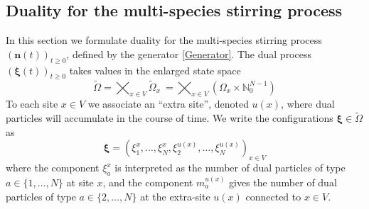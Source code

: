 \documentclass[11pt]{article}
\numberwithin{equation}{section}
\numberwithin{equation}{subsection}
\begin{document}
\subsection{Duality for the multi-species stirring process}\label{statementDualitySubsection}
In this section we formulate duality for the multi-species stirring process $(\mathbf{n}(t))_{t\geq 0}$, defined by the generator \eqref{Generator}.
The dual  process $(\bm{\xi}(t))_{t\geq 0}$ takes values in the enlarged state space
\begin{equation}\label{dualStateSpace}
    \widetilde{\Omega}= \bigtimes_{x\in V} \widetilde{\Omega}_{x}\ = \bigtimes_{x\in V} (\Omega_{x}\times \mathbb{N}_{0}^{N-1})
\end{equation}
To each site $x\in V$ we associate an ``extra site'', denoted $u(x)$,
where dual particles will accumulate in the course of time. 
We write the configurations $\bm{\xi} \in \widetilde\Omega$  as
\begin{equation}
    \bm{\xi}=\left(\xi_{1}^{x},\ldots,\xi_{N}^{x},\xi_{2}^{u(x)},\ldots,\xi_{N}^{u(x)}\right)_{x\in V}
\end{equation}
where the component $\xi_{a}^{x}$ is interpreted as the number of dual particles of type $a\in \{1,\ldots,N\}$ at site $x$, 
and the component $m_{a}^{u(x)}$  gives the number of dual particles of type $a\in \{2,\ldots,N\}$ at 
the extra-site $u(x)$ connected to $x\in V$.
\end{document}
